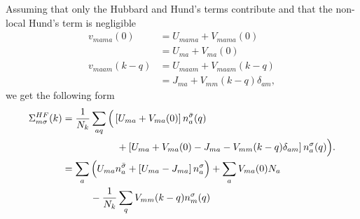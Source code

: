 \documentclass[12pt,a4paper]{scrartcl}
\numberwithin{equation}{section}
\begin{document}
Assuming that only the Hubbard and Hund's terms contribute and that the non-local
Hund's term is negligible
\begin{align}
v_{mama}(0) 
&= U_{mama} + V_{mama}(0) \\
&= U_{ma} + V_{ma}(0) \\
%
v_{maam}(k-q) 
&= U_{maam} + V_{maam}(k-q) \\
&= J_{ma} + V_{mm}(k-q)\delta_{am} ,
\end{align}
we get the following form
\begin{align}
\Sigma^{HF}_{m\sigma}(k)
&= \frac{1}{N_k}\sum_{aq}\Big(  \left[ U_{ma} + V_{ma}(0) \right] n^{\bar{\sigma}}_{a}(q) \nonumber\\
        & \hspace{1.95cm}   + \left[  U_{ma} + V_{ma}(0) - J_{ma} - V_{mm}(k-q)\delta_{am} \right] n^{\sigma}_a(q) \Big).\\
%
&= \sum_{a}\Big(  U_{ma} n^{\bar{\sigma}}_{a}  + \left[  U_{ma}- J_{ma} \right] n^{\sigma}_a \Big)
              +  \sum_{a}V_{ma}(0) N_a      \nonumber \\
       &\hspace{1cm} -\frac{1}{N_k}\sum_{q} V_{mm}(k-q) n^{\sigma}_m(q) 
\end{align}



\end{document}
